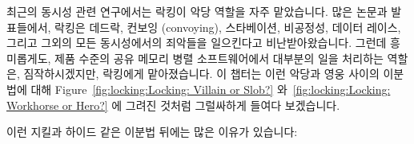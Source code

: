 
%

최근의 동시성 관련 연구에서는 락킹이 악당 역할을 자주 맡았습니다.
많은 논문과 발표들에서, 락킹은 데드락, 컨보잉 (convoying), 스타베이션,
비공정성, 데이터 레이스, 그리고 그외의 모든 동시성에서의 죄악들을 일으킨다고
비난받아왔습니다.
그런데 흥미롭게도, 제품 수준의 공유 메모리 병렬 소프트웨어에서 대부분의 일을
처리하는 역할은, 짐작하시겠지만, 락킹에게 맡아졌습니다.
이 챕터는 이런 악당과 영웅 사이의 이분법에 대해 
Figure~\ref{fig:locking:Locking: Villain or Slob?}
와~\ref{fig:locking:Locking: Workhorse or Hero?} 에 그려진 것처럼 그럴싸하게
들여다 보겠습니다.

이런 지킬과 하이드 같은 이분법 뒤에는 많은 이유가 있습니다:

